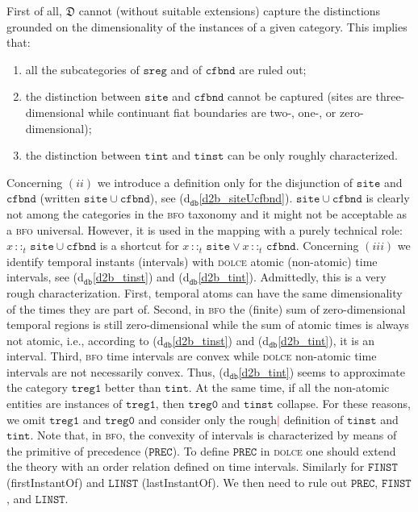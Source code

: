 \documentclass[ao]{iosart2x}
\newcommand{\nb}[1]{\textcolor{red}{$|$}\marginpar{\hspace*{-0cm}\parbox{20mm}{\scriptsize\raggedright\textcolor{red}{#1}}}}
\newcommand{\dbDefLabel}{\textrm{d$_\texttt{db}$}}
\newcommand{\refdbdf}[1]{({\dbDefLabel}\ref{#1})}
\newcommand{\pr}[1]{\mathtt{#1}}
\newcommand{\cn}[1]{\mathtt{#1}}
\newcommand{\dolce}{{\textsc{dolce}}}
\newcommand{\bfo}{{\textsc{bfo}}}
\newcommand {\thdolce} {\ensuremath{\mathfrak{D}}}
\newcommand{\sitebcat}{\cn{site}}
\newcommand{\cfbndbcat}{\cn{cfbnd}}
\newcommand{\sregbcat}{\cn{sreg}}
\newcommand{\tinstbcat}{\cn{tinst}}
\newcommand{\tintbcat}{\cn{tint}}
\newcommand{\onetregbcat}{\cn{treg1}}
\newcommand{\zerotregbcat}{\cn{treg0}}
\newcommand{\bfoiof}[1]{{\,::_{#1\:\!}}}
\begin{document}
First of all, {$\thdolce$} cannot (without suitable extensions) capture the distinctions grounded on the dimensionality of the instances of a given category. This implies that: 
\begin{enumerate}[$(i)$]
\item all the subcategories of $\sregbcat$ and of $\cfbndbcat$ are ruled out; 
\item the distinction between $\sitebcat$ and $\cfbndbcat$ cannot be captured (sites are three-dimensional while continuant fiat boundaries are two-, one-, or zero-dimensional); 
\item the distinction between $\tintbcat$ and $\tinstbcat$ can be only roughly characterized.
\end{enumerate} 

Concerning $(ii)$ we introduce a definition only for the disjunction of $\sitebcat$ and $\cfbndbcat$ (written $\sitebcat{\cup}\cfbndbcat$), see \refdbdf{d2b_siteUcfbnd}. $\sitebcat{\cup}\cfbndbcat$ is clearly not among the categories in the {\bfo} taxonomy and it might not be acceptable as a {\bfo} universal. However, it is used in the mapping with a purely technical role: $x \bfoiof{t} \sitebcat{\cup}\cfbndbcat$ is a shortcut for $x \bfoiof{t} \sitebcat \lor x \bfoiof{t}\cfbndbcat$. %
Concerning $(iii)$ we identify temporal instants (intervals) with {\dolce} atomic (non-atomic) time intervals, see \refdbdf{d2b_tinst} and \refdbdf{d2b_tint}. Admittedly, this is a very rough characterization. First, temporal atoms can have the same dimensionality of the times they are part of. Second, in {\bfo} the (finite) sum of zero-dimensional temporal regions is still zero-dimensional while the sum of atomic times is always not atomic, i.e., according to \refdbdf{d2b_tinst} and \refdbdf{d2b_tint}, {it is} an interval. Third, {\bfo} time intervals are convex while {\dolce} non-atomic time intervals are not necessarily convex. Thus, \refdbdf{d2b_tint} seems to approximate the category $\onetregbcat$ better than $\tintbcat$. At the same time, if all the non-atomic entities are instances of  $\onetregbcat$, then $\zerotregbcat$ and $\tinstbcat$ collapse. For these reasons, we omit $\onetregbcat$ and $\zerotregbcat$ and 
consider only the rough\nb{SB: perch\`e rough? si pu\`o togliere?} definition of $\tinstbcat$ and $\tintbcat$. Note that, in {\bfo}, the convexity of intervals is characterized by means of the primitive of precedence ($\pr{PREC}$). To define $\pr{PREC}$ in {\dolce} one should extend the theory with an order relation defined on time intervals. Similarly for $\pr{FINST}$ (firstInstantOf) and $\pr{LINST}$ (lastInstantOf). We then need to rule out $\pr{PREC}$, $\pr{FINST}$, and $\pr{LINST}$.
\end{document}
